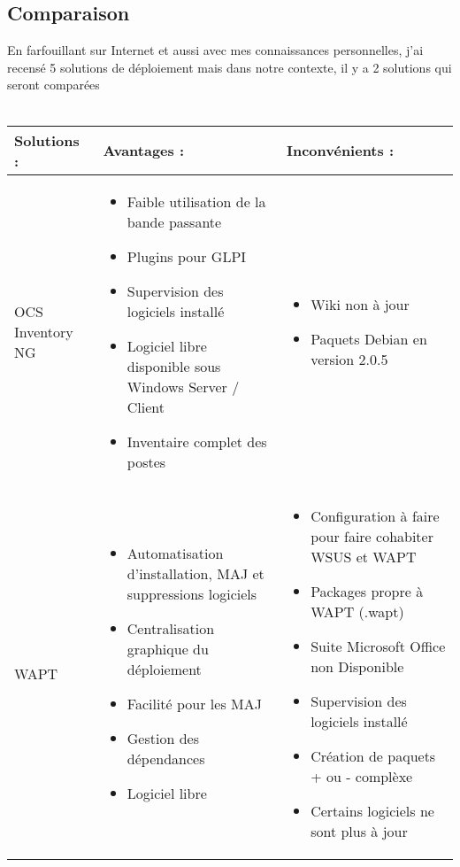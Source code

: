 \documentclass[11pt,a4paper,oneside]{article}
\begin{document}
\subsection{Comparaison}
En farfouillant sur Internet et aussi avec mes connaissances personnelles, j'ai recens{\'e} 5 solutions de d{\'e}ploiement mais dans notre contexte, il y a 2 solutions qui seront compar{\'e}es \\ \\
\begin{tabular}{|p{3.1cm}|p{6.5cm}|p{6.5cm}|}
	\hline
	\centering Solutions : & \centering Avantages : & Inconv{\'e}nients : \\
	\hline
	\centering OCS Inventory NG  & \begin{itemize}
							\item Faible utilisation de la bande passante 
							\item Plugins pour GLPI							
							\item Supervision des logiciels install{\'e}
							\item Logiciel libre disponible sous Windows Server / Client
							\item Inventaire complet des postes							
						\end{itemize} & \begin{itemize}
												\item Wiki non à jour  
												\item Paquets Debian en version 2.0.5																			\end{itemize} \\
	\hline
	\centering WAPT  & \begin{itemize}
							\item Automatisation d'installation, MAJ et suppressions logiciels 
							\item Centralisation graphique du d{\'e}ploiement
							\item Facilit{\'e} pour les MAJ 
							\item Gestion des d{\'e}pendances
							\item Logiciel libre													
						\end{itemize} & \begin{itemize}
												\item Configuration à faire pour faire cohabiter WSUS et WAPT 
												\item Packages propre à WAPT (.wapt)
												\item Suite Microsoft Office non Disponible
												\item Supervision des logiciels install{\'e}
												\item Cr{\'e}ation de paquets + ou - complèxe
												\item Certains logiciels ne sont plus à jour			
										\end{itemize} \\
	\hline	
\end{tabular}
\end{document}
